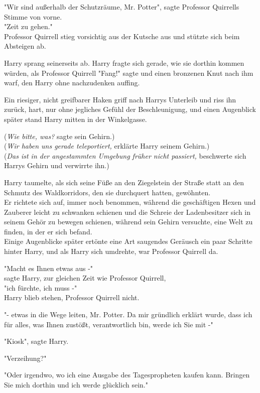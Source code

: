 {"Wir sind außerhalb der Schutzräume, Mr. Potter", sagte Professor Quirrells Stimme von vorne.\\ "Zeit zu gehen."\\ Professor Quirrell stieg vorsichtig aus der Kutsche aus und stützte sich beim Absteigen ab.

Harry sprang seinerseits ab. Harry fragte sich gerade, wie sie dorthin kommen würden, als Professor Quirrell "Fang!" sagte und einen bronzenen Knut nach ihm warf, den Harry ohne nachzudenken auffing.

Ein riesiger, nicht greifbarer Haken griff nach Harrys Unterleib und riss ihn zurück, hart, nur ohne jegliches Gefühl der Beschleunigung, und einen Augenblick später stand Harry mitten in der Winkelgasse.

(\emph{Wie bitte, was?} sagte sein Gehirn.)\\ (\emph{Wir haben uns gerade teleportiert,} erklärte Harry seinem Gehirn.)\\ (\emph{Das ist in der angestammten Umgebung früher nicht passiert,} beschwerte sich Harrys Gehirn und verwirrte ihn.)

Harry taumelte, als sich seine Füße an den Ziegelstein der Straße statt an den Schmutz des Waldkorridors, den sie durchquert hatten, gewöhnten.\\ Er richtete sich auf, immer noch benommen, während die geschäftigen Hexen und Zauberer leicht zu schwanken schienen und die Schreie der Ladenbesitzer sich in seinem Gehör zu bewegen schienen, während sein Gehirn versuchte, eine Welt zu finden, in der er sich befand.\\ Einige Augenblicke später ertönte eine Art saugendes Geräusch ein paar Schritte hinter Harry, und als Harry sich umdrehte, war Professor Quirrell da.

"Macht es Ihnen etwas aus -"\\ sagte Harry, zur gleichen Zeit wie Professor Quirrell,\\ "ich fürchte, ich muss -"\\ Harry blieb stehen, Professor Quirrell nicht.

"- etwas in die Wege leiten, Mr. Potter. Da mir gründlich erklärt wurde, dass ich für alles, was Ihnen zustößt, verantwortlich bin, werde ich Sie mit -"

"Kiosk", sagte Harry.

"Verzeihung?"

"Oder irgendwo, wo ich eine Ausgabe des Tagespropheten kaufen kann. Bringen Sie mich dorthin und ich werde glücklich sein."

}
